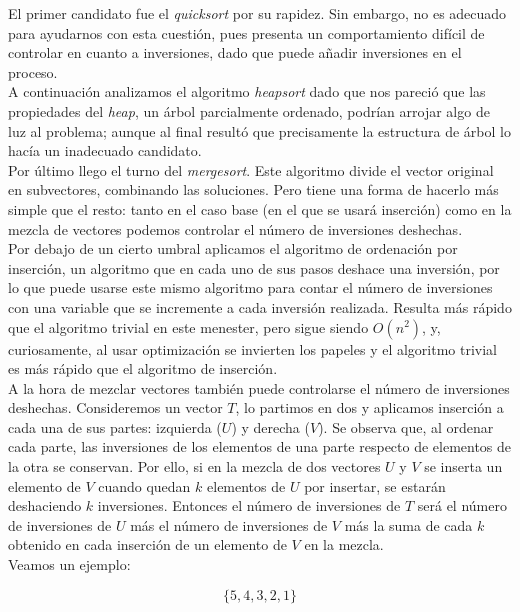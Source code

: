 El primer candidato fue el \textit{quicksort} por su rapidez. Sin embargo, no es adecuado para ayudarnos con esta cuestión, pues presenta un comportamiento difícil de controlar en cuanto a inversiones, dado que puede añadir inversiones en el proceso. \\ 

A continuación analizamos el algoritmo \textit{heapsort} dado que nos pareció que las propiedades del \textit{heap}, un árbol parcialmente ordenado, podrían arrojar algo de luz al problema; aunque al final resultó que precisamente la estructura de árbol lo hacía un inadecuado candidato. \\

Por último llego el turno del \textit{mergesort}. Este algoritmo divide el vector original en subvectores, combinando las soluciones. Pero tiene una forma de hacerlo más simple que el resto: tanto en el caso base (en el que se usará inserción) como en la mezcla de vectores podemos controlar el número de inversiones deshechas. \\

Por debajo de un cierto umbral aplicamos el algoritmo de ordenación por inserción, un algoritmo que en cada uno de sus pasos deshace una inversión, por lo que puede usarse este mismo algoritmo para contar el número de inversiones con una variable que se incremente a cada inversión realizada. Resulta más rápido que el algoritmo trivial en este menester, pero sigue siendo $O(n^2)$, y, curiosamente, al usar optimización se invierten los papeles y el algoritmo trivial es más rápido que el algoritmo de inserción. \\

A la hora de mezclar vectores también puede controlarse el número de inversiones deshechas. Consideremos un vector $T$, lo partimos en dos y aplicamos inserción a cada una de sus partes: izquierda ($U$) y derecha ($V$). Se observa que, al ordenar cada parte, las inversiones de los elementos de una parte respecto de elementos de la otra se conservan. Por ello, si en la mezcla de dos vectores $U$ y $V$ se inserta un elemento de $V$ cuando quedan $k$ elementos de $U$ por insertar, se estarán deshaciendo $k$ inversiones. Entonces el número de inversiones de $T$ será el número de inversiones de $U$ más el número de inversiones de $V$ más la suma de cada $k$ obtenido en cada inserción de un elemento de $V$ en la mezcla.\\

Veamos un ejemplo:

$$ \{5,4,3,2,1\}$$

